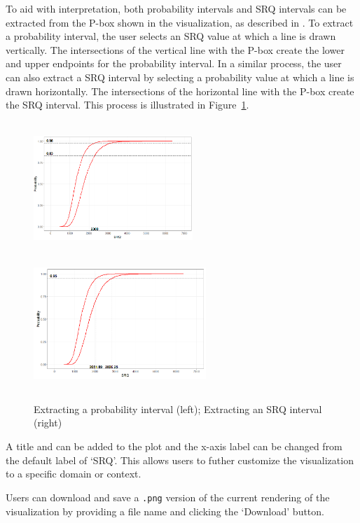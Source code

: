 \documentclass[11pt]{asaproc}\usepackage[]{graphicx}\usepackage[]{color}
\begin{document}
To aid with interpretation, both probability intervals and SRQ intervals can be extracted from the P-box shown in the visualization, as described in \cite{EW2018}. To extract a probability interval, the user selects an SRQ value at which a line is drawn vertically. The intersections of the vertical line with the P-box create the lower and upper endpoints for the probability interval. In a similar process, the user can also extract a SRQ interval by selecting a probability value at which a line is drawn horizontally. The intersections of the horizontal line with the P-box create the SRQ interval. This process is illustrated in Figure~\ref{ext_int}. 

\begin{figure}[t]
\begin{center}
\includegraphics[height=5cm,width=6cm]{figures2/prob_int.png}
\includegraphics[height=5cm,width=6.5cm]{figures2/srq_int.png}
\end{center}
\caption{\label{ext_int}Extracting a probability interval (left); Extracting an SRQ interval (right)}
\end{figure}

A title and can be added to the plot and the x-axis label can be changed from the default label of `SRQ'. This allows users to futher customize the visualization to a specific domain or context. 

Users can download and save a {\tt .png} version of the current rendering of the visualization by providing a file name and clicking the `Download' button. 
\end{document}
